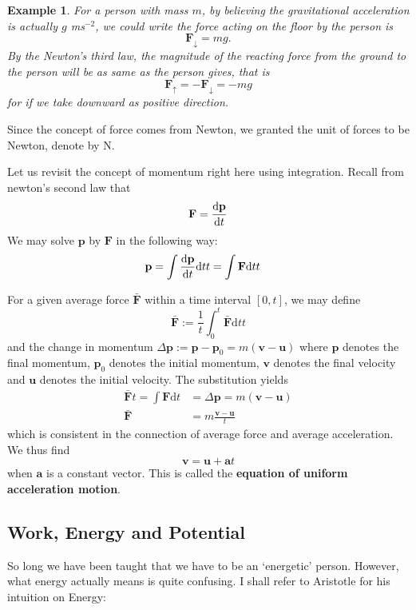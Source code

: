 \documentclass[12pt]{article}
\renewcommand{\d}[1]{\mathrm{d}{#1}}
\newtheorem*{example}{Example}
\begin{document}
    \begin{example}
        For a person with mass $m$, by believing the gravitational acceleration is actually $g$ ms$^{-2}$, we could write the force acting on the floor by the person is \[\mathbf{F}_{\downarrow}=mg.\] By the Newton's third law, the magnitude of the reacting force from the ground to the person will be as same as the person gives, that is \[\mathbf{F}_{\uparrow}=-\mathbf{F}_{\downarrow}=-mg\] for if we take downward as positive direction.
    \end{example}

    Since the concept of force comes from Newton, we granted the unit of forces to be Newton, denote by N.

    Let us revisit the concept of momentum right here using integration. Recall from newton's second law that \[\mathbf{F}=\derivative{\mathbf{p}}{t}\] We may solve $\mathbf{p}$ by $\mathbf{F}$ in the following way:\begin{align*}
        \mathbf{p}=\int \derivative{\mathbf{p}}{t} \d{t}{t}&=\int \mathbf{F} \d{t}{t}
    \end{align*}

    For a given average force $\mathbf{\bar{F}}$ within a time interval $[0,t]$, we may define \[\mathbf{\bar{F}}:=\frac{1}{t}\int_{0}^{t} \mathbf{\bar{F}} \d{t}{t}\] and the change in momentum $\Delta \mathbf{p} := \mathbf{p} - \mathbf{p}_0 = m(\mathbf{v}-\mathbf{u})$ where $\mathbf{p}$ denotes the final momentum, $\mathbf{p}_0$ denotes the initial momentum, $\mathbf{v}$ denotes the final velocity and $\mathbf{u}$ denotes the initial velocity. The substitution yields \begin{align*}
        \mathbf{\bar{F}}t = \int \mathbf{F} \d{t} &= \Delta \mathbf{p} = m(\mathbf{v}-\mathbf{u})\\
        \mathbf{\bar{F}} &= m\frac{\mathbf{v}-\mathbf{u}}{t}
    \end{align*}
    which is consistent in the connection of average force and average acceleration. We thus find \[\mathbf{v}=\mathbf{u}+\mathbf{a}t\] when $\mathbf{a}$ is a constant vector. This is called the \textbf{equation of uniform acceleration motion}.

    \subsection{Work, Energy and Potential}

    So long we have been taught that we have to be an `energetic' person. However, what energy actually means is quite confusing. I shall refer to Aristotle for his intuition on Energy: 
\end{document}
